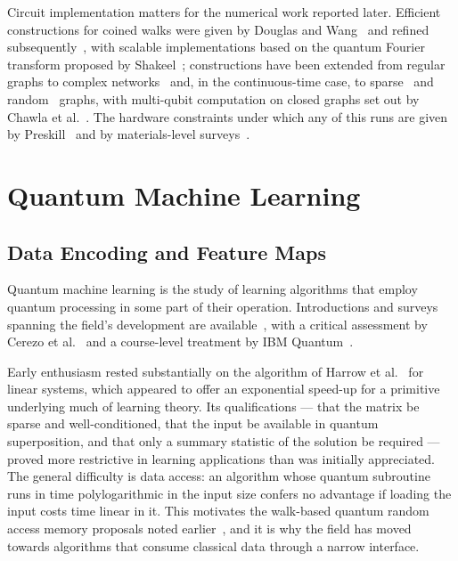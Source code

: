 Circuit implementation matters for the numerical work reported later. Efficient
constructions for coined walks were given by Douglas and
Wang~\cite{Douglas_2007} and refined subsequently~\cite{Han_2017}, with scalable
implementations based on the quantum Fourier transform proposed by
Shakeel~\cite{Shakeel_2020}; constructions have been extended from regular
graphs to complex networks~\cite{Sato_2024, Sato_2025} and, in the
continuous-time case, to sparse~\cite{Chen_2024a} and
random~\cite{Chakraborty_2025} graphs, with multi-qubit computation on closed
graphs set out by Chawla et al.~\cite{Chawla_2023}. The hardware constraints
under which any of this runs are given by Preskill~\cite{Preskill_2018} and by
materials-level surveys~\cite{doi:10.1126/science.abb2823}.


\section{Quantum Machine Learning}
\label{sec:lr-qml}

\subsection{Data Encoding and Feature Maps}
Quantum machine learning is the study of learning algorithms that employ quantum
processing in some part of their operation. Introductions and surveys spanning
the field's development are
available~\cite{Schuld_2015, Biamonte_2017, Ciliberto_2018, Tychola_2023,
Zeguendry_2023}, with a critical assessment by Cerezo et
al.~\cite{Cerezo_2023} and a course-level treatment by IBM
Quantum~\cite{IBMQML2026}.

Early enthusiasm rested substantially on the algorithm of Harrow et
al.~\cite{Harrow_2008} for linear systems, which appeared to offer an
exponential speed-up for a primitive underlying much of learning theory. Its
qualifications --- that the matrix be sparse and well-conditioned, that the
input be available in quantum superposition, and that only a summary statistic
of the solution be required --- proved more restrictive in learning applications
than was initially appreciated. The general difficulty is data access: an
algorithm whose quantum subroutine runs in time polylogarithmic in the input
size confers no advantage if loading the input costs time linear in it. This
motivates the walk-based quantum random access memory proposals noted
earlier~\cite{Asaka_2021}, and it is why the field has moved towards algorithms
that consume classical data through a narrow interface.

